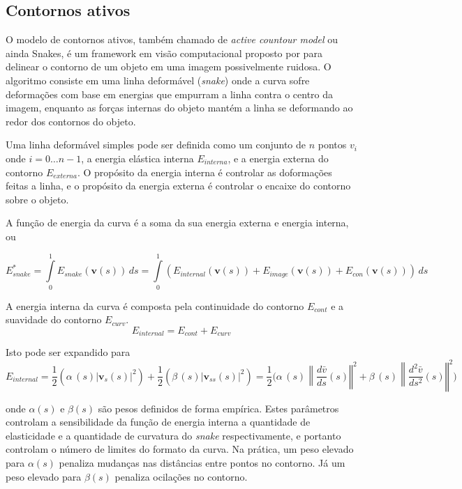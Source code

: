 \documentclass[12pt,oneside,a4paper,english,french,spanish,brazil,]{abntex2}
\begin{document}
\subsection{Contornos ativos}

O modelo de contornos ativos, também chamado de \textit{active countour model} ou ainda Snakes, é um framework em visão computacional proposto por \citet{kass:1988} para delinear o contorno de um objeto em uma imagem possivelmente ruidosa. O algoritmo consiste em uma linha deformável (\textit{snake}) onde a curva sofre deformações com base em energias que empurram a linha contra o centro da imagem, enquanto as forças internas do objeto mantém a linha se deformando ao redor dos contornos do objeto. 

Uma linha deformável simples pode ser definida como um conjunto de \(n\) pontos \({v} _{i}\) onde \(i=0\ldots n-1\), a energia elástica interna \(E_{interna}\), e a energia externa do contorno \(E_{externa}\). O propósito da energia interna é controlar as doformações feitas a linha, e o propósito da energia externa é controlar o encaixe do contorno sobre o objeto. 

A função de energia da curva é a soma da sua energia externa e energia interna, ou

\[E_{snake}^{*}=\int \limits _{0}^{1}E_{snake}(\mathbf {v} (s))\,ds=\int \limits _{0}^{1}(E_{internal}(\mathbf {v} (s))+E_{image}(\mathbf {v} (s))+E_{con}(\mathbf {v} (s)))\,ds\]

A energia interna da curva é composta pela continuidade do contorno \(E_{cont}\) e a suavidade do contorno \(E_{curv}\).
\[E_{internal}=E_{cont}+E_{curv}\]
 
Isto pode ser expandido para 
\[ E_{internal}={\frac {1}{2}}(\alpha \,\!(s)\left|\mathbf {v} _{s}(s)\right\vert ^{2})+{\frac {1}{2}}(\beta \,\!(s)\left|\mathbf {v} _{ss}(s)\right\vert ^{2})={\frac {1}{2}}{\bigg (}\alpha \,\!(s)\left\|{\frac {d{\bar {v}}}{ds}}(s)\right\Vert ^{2}+\beta \,\!(s)\left\|{\frac {d^{2}{\bar {v}}}{ds^{2}}}(s)\right\Vert ^{2}{\bigg )}\]

onde \(\alpha (s)\) e \(\beta (s)\) são pesos definidos de forma empírica. Estes parâmetros controlam a sensibilidade da função de energia interna a quantidade de elasticidade e a quantidade de curvatura do \textit{snake} respectivamente, e portanto controlam o número de limites do formato da curva. Na prática, um peso elevado para \(\alpha (s)\) penaliza mudanças nas distâncias entre pontos no contorno. Já um peso elevado para \(\beta (s)\) penaliza ocilações no contorno.
\end{document}
